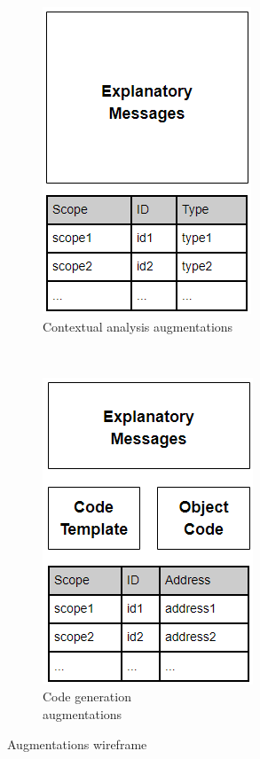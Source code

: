 \documentclass{l4proj}
\begin{document}
\begin{figure}[h]
	\centering
	\begin{subfigure}[b]{0.3\textwidth}
		\includegraphics[scale=0.6]{images/analytics-ca-wireframe.png}
		\caption{Contextual analysis augmentations}
		\label{fig:analytics-ca-wireframe}
	\end{subfigure}
	~
	\begin{subfigure}[b]{0.3\textwidth}
		\includegraphics[scale=0.6]{images/analytics-cg-wireframe.png}
		\caption{Code generation \\ augmentations}
		\label{fig:analytics-cg-wireframe}
	\end{subfigure}
	\caption{Augmentations wireframe}\label{fig:augmentations-wireframe}	
\end{figure}
\end{document}
